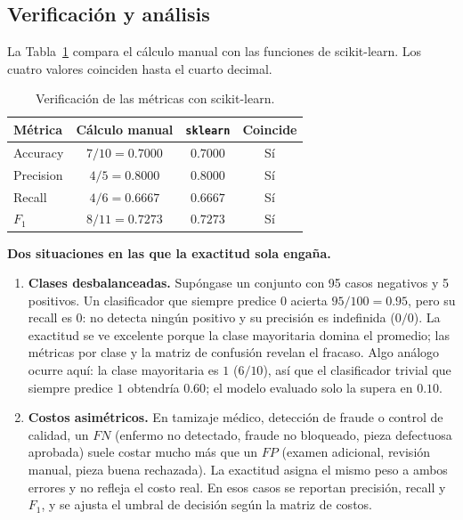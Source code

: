 \documentclass[12pt,a4paper]{article}
\begin{document}
\subsection{Verificación y análisis}

La Tabla~\ref{tab:verif} compara el cálculo manual con las funciones de
scikit-learn. Los cuatro valores coinciden hasta el cuarto decimal.

\begin{table}[H]
  \centering
  \small
  \caption{Verificación de las métricas con scikit-learn.}
  \label{tab:verif}
  \begin{tabular}{@{}lccc@{}}
    \toprule
    Métrica & Cálculo manual & \texttt{sklearn} & Coincide \\
    \midrule
    Accuracy  & $7/10=0.7000$  & $0.7000$ & Sí \\
    Precision & $4/5=0.8000$   & $0.8000$ & Sí \\
    Recall    & $4/6=0.6667$   & $0.6667$ & Sí \\
    $F_1$     & $8/11=0.7273$  & $0.7273$ & Sí \\
    \bottomrule
  \end{tabular}
\end{table}

\textbf{Dos situaciones en las que la exactitud sola engaña.}

\begin{enumerate}[leftmargin=1.4em,itemsep=0.35em]
  \item \textbf{Clases desbalanceadas.} Supóngase un conjunto con 95 casos
  negativos y 5 positivos. Un clasificador que siempre predice $0$ acierta
  $95/100=0.95$, pero su recall es $0$: no detecta ningún positivo y su
  precisión es indefinida ($0/0$). La exactitud se ve excelente porque la clase
  mayoritaria domina el promedio; las métricas por clase y la matriz de
  confusión revelan el fracaso. Algo análogo ocurre aquí: la clase mayoritaria
  es $1$ ($6/10$), así que el clasificador trivial que siempre predice $1$
  obtendría $0.60$; el modelo evaluado solo la supera en $0.10$.
  \item \textbf{Costos asimétricos.} En tamizaje médico, detección de fraude o
  control de calidad, un $FN$ (enfermo no detectado, fraude no bloqueado,
  pieza defectuosa aprobada) suele costar mucho más que un $FP$ (examen
  adicional, revisión manual, pieza buena rechazada). La exactitud asigna el
  mismo peso a ambos errores y no refleja el costo real. En esos casos se
  reportan precisión, recall y $F_1$, y se ajusta el umbral de decisión según la
  matriz de costos.
\end{enumerate}
\end{document}
